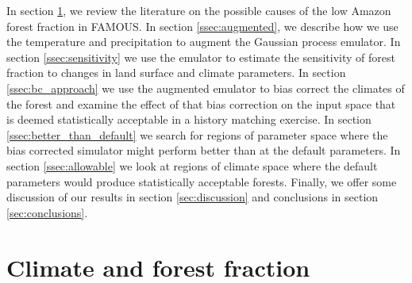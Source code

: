 \documentclass[gmd, manuscript]{copernicus}
\begin{document}
In section \ref{sec:climate_and_frac}, we review the literature on the possible causes of the low Amazon forest fraction in FAMOUS. In section \ref{ssec:augmented}, we describe how we use the temperature and precipitation to augment the Gaussian process emulator. In section \ref{ssec:sensitivity} we use the emulator to estimate the sensitivity of forest fraction to changes in land surface and climate parameters. In section \ref{ssec:bc_approach} we use the augmented emulator to bias correct the climates of the forest and examine the effect of that bias correction on the input space that is deemed statistically acceptable in a history matching exercise. In section \ref{ssec:better_than_default} we search for regions of parameter space where the bias corrected simulator might perform better than at the default parameters. In section \ref{ssec:allowable} we look at regions of climate space where the default parameters would produce statistically acceptable forests. Finally, we offer some discussion of our results in section \ref{sec:discussion} and conclusions in section \ref{sec:conclusions}.

\section{Climate and forest fraction}\label{sec:climate_and_frac}
\end{document}
